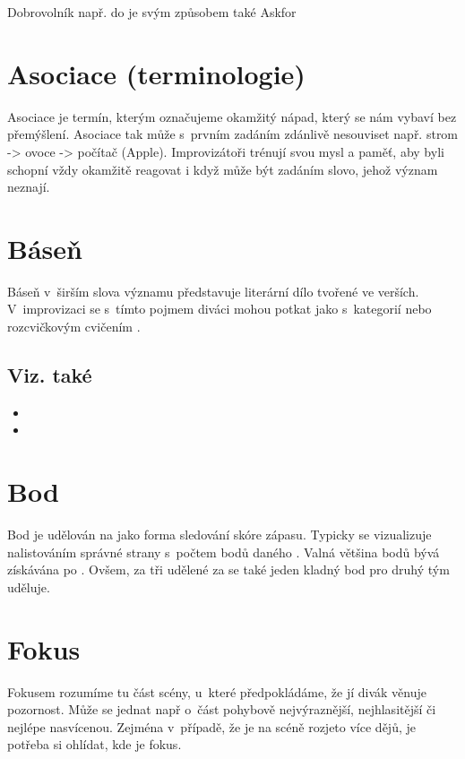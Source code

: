 Dobrovolník např. do  je svým způsobem také Askfor 
 
 
\needspace{5cm} \section{Asociace (terminologie)} \label{asociace (terminologie)} Asociace je termín, kterým označujeme okamžitý nápad, který se nám vybaví bez přemýšlení. Asociace tak může s~prvním zadáním zdánlivě nesouviset např. strom -> ovoce -> počítač (Apple). Improvizátoři trénují svou mysl a paměť, aby byli schopní vždy okamžitě reagovat i když může být zadáním slovo, jehož význam neznají. 
 
 
\needspace{5cm} \section{Báseň} \label{báseň} Báseň v~širším slova významu představuje literární dílo tvořené ve verších. 
V~improvizaci se s~tímto pojmem diváci mohou potkat jako s~kategorií  nebo rozcvičkovým cvičením . 
 
\subsection{Viz. také} \begin{itemize}
\item {}
\item {}
\end{itemize}
 
 
\needspace{5cm} \section{Bod} \label{bod} Bod je udělován na  jako forma sledování skóre zápasu. Typicky se vizualizuje nalistováním správné strany s~počtem bodů daného .  
Valná většina bodů bývá získávána po  .   
Ovšem, za tři  udělené za  se také jeden kladný bod pro druhý tým uděluje. 
 
 
\needspace{5cm} \section{Fokus} \label{fokus} Fokusem rozumíme tu část scény, u~které předpokládáme, že jí divák věnuje pozornost. 
Může se jednat např o~část pohybově nejvýraznější, nejhlasitější či nejlépe nasvícenou. 
Zejména v~případě, že je na scéně rozjeto více dějů, je potřeba si ohlídat, kde je fokus. 
 
